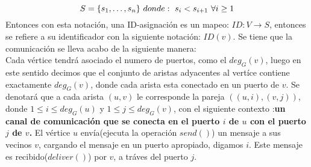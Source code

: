 \documentclass[10pt]{report}
\begin{document}
    \begin{equation}
        S = \{ s_{1},\mathellipsis,s_{n}\} \
        donde:\ s_{i} < s_{i+1} \ \forall i\geq 1\label{eq:equation}
    \end{equation}
    Entonces con esta notación, una ID-asignación es un mapeo:
    $ID:V\rightarrow S$, entonces se refiere a su identificador con la siguiente notación:
    $ID(v)$. \newline
    Se tiene que la comunicación se lleva acabo de la siguiente manera:\\
    \newline
    Cada vértice tendrá asociado el numero de puertos, como el $deg_{G}(v)$,
    luego en este sentido decimos que el conjunto de aristas adyacentes al vertíce
    contiene exactamente $deg_{G}(v)$, donde cada arista esta conectado en un puerto de $v$.
    \newline
    Se denotará que a cada arista $(u,v)$ le corresponde la pareja
    $((u,i),(v,j))$, donde $1\leq i \leq deg_{G}(u) $ y $1\leq j \leq deg_{G}(v)$,
    con el siguiente contexto :\newline \textbf{un canal de comunicación que se conecta en el puerto $i$  de $u$ con el puerto $j$ de
    $v$.}\newline
    El vértice $u$ envía(ejecuta la operación $send()$) un mensaje a sus vecinos $v$, cargando el mensaje en un puerto apropiado, digamos $i$.
    Este mensaje es recibido($deliver()$) por $v$, a tráves del puerto $j$. \newline

\end{document}
